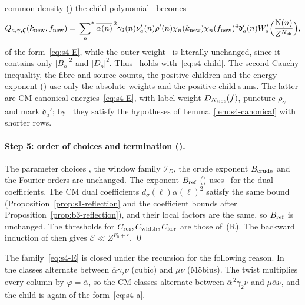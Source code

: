 \documentclass[11pt]{article}
\numberwithin{equation}{section}
\newcommand{\N}{\mathrm N}
\newcommand{\ssum}{\sideset{}{^*}\sum}
\begin{document}
common density (\cite[proof of Lemma~17.2, \emph{A common density for the second transformed sum}]{OAI78}) the child polynomial~\cite[eq.~(17.55)]{OAI78} becomes
\begin{equation}\label{eq:s4-child}
 Q_{a,\gamma,\boldsymbol\zeta}(k_{\rm new},f_{\rm new})=\ssum_n\overline{\alpha(n)}^{\,2}\gamma_2(n)\nu_a'(n)\rho'(n)
 \chi_n(k_{\rm new})\chi_n(f_{\rm new})^4\mathfrak d_a'(n)W_a'\Bigl(\frac{\N(n)}{Z^{N_{\rm ch}}}\Bigr),
\end{equation}
of the form~\eqref{eq:s4-E}, while the outer weight~\cite[eq.~(17.56)]{OAI78} is
literally unchanged, since it contains only $|B_o|^2$ and $|D_o|^2$. Thus~\cite[eq.~(17.57)]{OAI78} holds with~\eqref{eq:s4-child}. The second Cauchy inequality, the fibre and source counts, the positive
children and the energy exponent (\cite[proof of Lemma~17.2]{OAI78}) use only the absolute weights and the positive child sums. The
latter are CM canonical energies~\eqref{eq:s4-E}, with label weight $D_{K_{\rm slot}}(f)$, puncture
$\rho_\gamma$ and mark $\mathfrak d_a'$; by~\cite[eqs.~(17.51) and~(17.52)]{OAI78}
they satisfy the hypotheses of Lemma~\ref{lem:s4-canonical} with shorter rows.

\paragraph{Step 5: order of choices and termination (\cite[proof of Lemma~17.2, \emph{Order of choices and termination}]{OAI78}).} The parameter choices
\cite[eq.~(17.66)]{OAI78}, the window family $\mathcal I_D$, the crude exponent $B_{\rm crude}$ and
the Fourier orders are unchanged. The exponent $B_{\rm ref}$ (\cite[proof of Lemma~17.2, \emph{Order of choices and termination}]{OAI78}) uses~\cite[eq.~(5.2)]{OAI78} for
the dual coefficients. The CM dual coefficients $d_\sigma(\ell)\alpha(\ell)^2$ satisfy the same bound
(Proposition~\ref{prop:s1-reflection} and the coefficient bounds after Proposition~\ref{prop:b3-reflection}), and
their local factors are the same,
so $B_{\rm ref}$ is unchanged. The thresholds for $C_{\rm res},C_{\rm width},C_{\rm ker}$ are those of~(R). The
backward induction of \cite[proof of Lemma~17.2, \emph{Order of choices and termination}]{OAI78} then gives $\mathcal E\ll Z^{F_0+\varepsilon}$. \qed

The family~\eqref{eq:s4-E} is closed under the recursion for the following reason. In~\cite{OAI78} the classes
alternate between $\overline\alpha\gamma_2\nu$ (cubic) and $\mu\nu$ (M\"obius). The twist multiplies every column
by $\varphi=\overline\alpha$, so the CM classes alternate between $\overline\alpha^{\,2}\gamma_2\nu$ and
$\mu\overline\alpha\nu$, and the child is again of the form~\eqref{eq:s4-a}.
\end{document}
